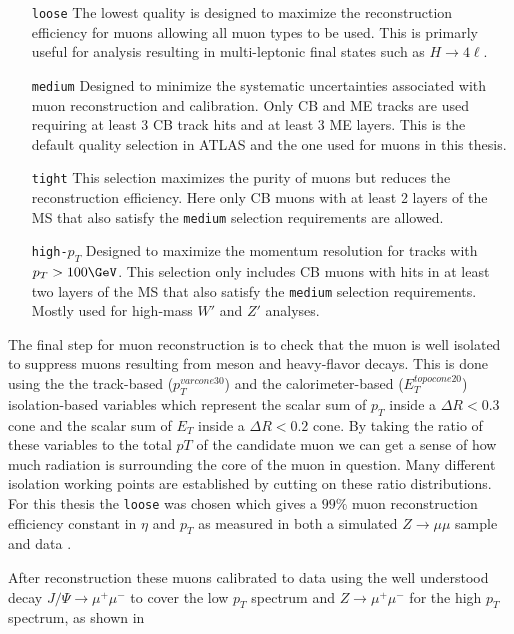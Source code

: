 \begin{enumerate}
  \item[\texttt{loose}] The lowest quality is designed to maximize the reconstruction efficiency for muons allowing all muon types to be used.  This is primarly useful for analysis resulting in multi-leptonic final states such as $H \rightarrow 4\ell$.
  \item[\texttt{medium}] Designed to minimize the systematic uncertainties associated with muon reconstruction and calibration.  Only CB and ME tracks are used requiring at least 3 CB track hits and at least 3 ME layers.  This is the default quality selection in ATLAS and the one used for muons in this thesis.
  \item[\texttt{tight}] This selection maximizes the purity of muons but reduces the reconstruction efficiency. Here only CB muons with at least 2 layers of the MS that also satisfy the \texttt{medium} selection requirements are allowed.
  \item[\texttt{high-$p_{T}$}] Designed to maximize the momentum resolution for tracks with $p_{T} > 100 \GeV$.  This selection only includes CB muons with hits in at least two layers of the MS that also satisfy the \texttt{medium} selection requirements.  Mostly used for high-mass $W'$ and $Z'$ analyses.
\end{enumerate}

The final step for muon reconstruction is to check that the muon is well
isolated to suppress muons resulting from meson and heavy-flavor decays. This
is done using the the track-based ($p_{T}^{varcone30}$) and the
calorimeter-based ($E_{T}^{topocone20}$) isolation-based variables which
represent the scalar sum of $p_{T}$ inside a $\Delta R < 0.3$ cone and the
scalar sum of $E_{T}$ inside a $\Delta R < 0.2$ cone.  By taking the ratio of
these variables to the total $p{T}$ of the candidate muon we can get a sense of
how much radiation is surrounding the core of the muon in question. Many
different isolation working points are established by cutting on these ratio
distributions. For this thesis the \texttt{loose} was chosen which gives a
$99\%$ muon reconstruction efficiency constant in $\eta$ and $p_{T}$ as
measured in both a simulated $Z \rightarrow \mu\mu$ sample and data \cite{Aad:2016jkr}.

After reconstruction these muons calibrated to data using the well understood
decay $J/\Psi \rightarrow \mu^{+}\mu^{-}$ to cover the low $p_{T}$ spectrum and
$Z \rightarrow \mu^{+}\mu^{-}$ for the high $p_{T}$ spectrum, as shown in 

